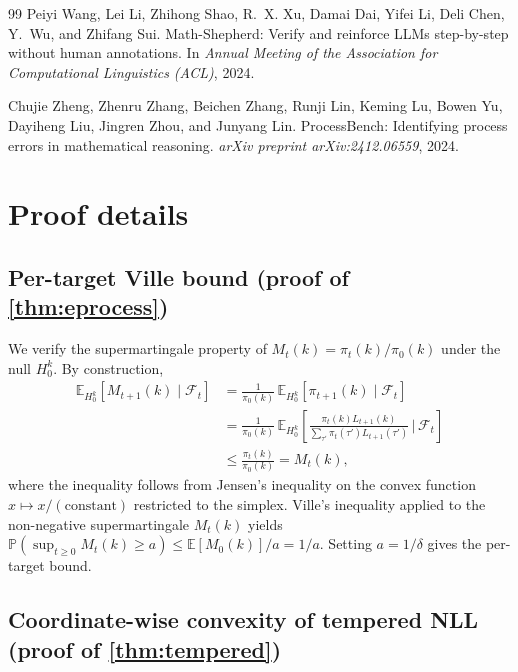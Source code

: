 \documentclass[11pt,a4paper]{article}
\newcommand{\E}{\mathbb{E}}
\newcommand{\Prob}{\mathbb{P}}
\theoremstyle{plain}
\theoremstyle{definition}
\theoremstyle{remark}
\begin{document}
\begin{thebibliography}{99}
Peiyi Wang, Lei Li, Zhihong Shao, R.~X. Xu, Damai Dai, Yifei Li,
  Deli Chen, Y.~Wu, and Zhifang Sui.
\newblock Math-Shepherd: Verify and reinforce LLMs step-by-step
  without human annotations.
\newblock In \emph{Annual Meeting of the Association for
  Computational Linguistics (ACL)}, 2024.

Chujie Zheng, Zhenru Zhang, Beichen Zhang, Runji Lin, Keming Lu,
  Bowen Yu, Dayiheng Liu, Jingren Zhou, and Junyang Lin.
\newblock ProcessBench: Identifying process errors in mathematical
  reasoning.
\newblock \emph{arXiv preprint arXiv:2412.06559}, 2024.

\end{thebibliography}

\appendix
\section{Proof details}
\label{app:proofs}

\subsection{Per-target Ville bound (proof of \cref{thm:eprocess})}

We verify the supermartingale property of
$M_t(k) = \pi_t(k)/\pi_0(k)$ under the null $H_0^k$. By construction,
\begin{align*}
\E_{H_0^k}[M_{t+1}(k) \mid \mathcal{F}_t]
  &= \frac{1}{\pi_0(k)}\,
    \E_{H_0^k}[\pi_{t+1}(k) \mid \mathcal{F}_t] \\
  &= \frac{1}{\pi_0(k)}\,
    \E_{H_0^k}\!\left[
      \frac{\pi_t(k) L_{t+1}(k)}
           {\sum_{\tau'} \pi_t(\tau') L_{t+1}(\tau')}
      \,\Big|\, \mathcal{F}_t \right] \\
  &\leq \frac{\pi_t(k)}{\pi_0(k)} = M_t(k),
\end{align*}
where the inequality follows from Jensen's inequality on the convex
function $x \mapsto x/(\text{constant})$ restricted to the simplex.
Ville's inequality applied to the non-negative supermartingale
$M_t(k)$ yields
$\Prob(\sup_{t \geq 0} M_t(k) \geq a) \leq \E[M_0(k)]/a = 1/a$.
Setting $a = 1/\delta$ gives the per-target bound.

\subsection{Coordinate-wise convexity of tempered NLL
(proof of \cref{thm:tempered})}
\end{document}
